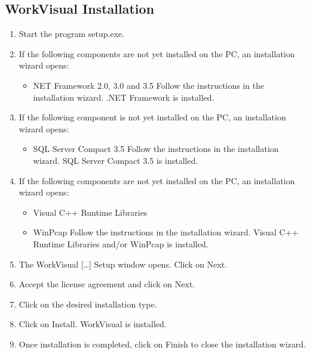 			\subsection{WorkVisual Installation}
				\begin{enumerate}
					\item Start the program setup.exe.
					\item If the following components are not yet installed on the PC, an installation wizard opens:
						\begin{itemize}
							\item NET Framework 2.0, 3.0 and 3.5
							Follow the instructions in the installation wizard. .NET Framework is installed.
						\end{itemize}
					
					\item If the following component is not yet installed on the PC, an installation wizard opens:
						\begin{itemize}
						\item SQL Server Compact 3.5
						Follow the instructions in the installation wizard. SQL Server Compact 3.5 is installed.
						\end{itemize}
					
					\item If the following components are not yet installed on the PC, an installation wizard opens:
						\begin{itemize}
							\item Visual C++ Runtime Libraries
							\item WinPcap
							Follow the instructions in the installation wizard. Visual C++ Runtime Libraries	and/or WinPcap is installed.
						\end{itemize}
					\item The WorkVisual […] Setup window opens. Click on Next.
					\item Accept the license agreement and click on Next.
					\item Click on the desired installation type.
					\item Click on Install. WorkVisual is installed.	
					\item Once installation is completed, click on Finish to close the installation wizard.
				\end{enumerate}
            
